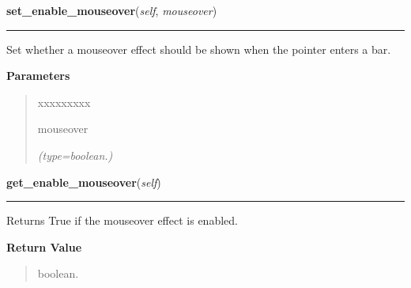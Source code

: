     \label{pygtk_chart:bar_chart:BarChart:set_enable_mouseover}

    \vspace{0.5ex}

\hspace{.8\funcindent}\begin{boxedminipage}{\funcwidth}

    \raggedright \textbf{set\_enable\_mouseover}(\textit{self}, \textit{mouseover})

    \vspace{-1.5ex}

    \rule{\textwidth}{0.5\fboxrule}
\setlength{\parskip}{2ex}
    Set whether a mouseover effect should be shown when the pointer enters 
    a bar.

\setlength{\parskip}{1ex}
      \textbf{Parameters}
      \vspace{-1ex}

      \begin{quote}
        \begin{Ventry}{xxxxxxxxx}

          \item[mouseover]

            {\it (type=boolean.)}

        \end{Ventry}

      \end{quote}

    \end{boxedminipage}

    \label{pygtk_chart:bar_chart:BarChart:get_enable_mouseover}

    \vspace{0.5ex}

\hspace{.8\funcindent}\begin{boxedminipage}{\funcwidth}

    \raggedright \textbf{get\_enable\_mouseover}(\textit{self})

    \vspace{-1.5ex}

    \rule{\textwidth}{0.5\fboxrule}
\setlength{\parskip}{2ex}
    Returns True if the mouseover effect is enabled.

\setlength{\parskip}{1ex}
      \textbf{Return Value}
    \vspace{-1ex}

      \begin{quote}
      boolean.

      \end{quote}

    \end{boxedminipage}


